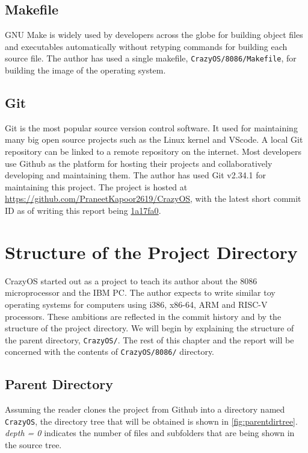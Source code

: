 \subsection{Makefile}
GNU Make is widely used by developers across the globe for building object files and executables automatically without retyping commands for building each source file. The author has used a single makefile, \verb|CrazyOS/8086/Makefile|, for building the image of the operating system.

\subsection{Git}
Git is the most popular source version control software. It used for maintaining many big open source projects such as the Linux kernel and VScode. A local Git repository can be linked to a remote repository on the internet. Most developers use Github as the platform for hosting their projects and collaboratively developing and maintaining them. The author has used Git v2.34.1 for maintaining this project. The project is hosted at \url{https://github.com/PraneetKapoor2619/CrazyOS}, with the latest short commit ID as of writing this report being \href{https://github.com/PraneetKapoor2619/CrazyOS/tree/1a17fa09b6df15038edabdefe9fd9ab04cb80907}{1a17fa0}.   

\section{Structure of the Project Directory}
CrazyOS started out as a project to teach its author about the 8086 microprocessor and the IBM PC. The author expects to write similar toy operating systems for computers using i386, x86-64, ARM and RISC-V processors. These ambitions are reflected in the commit history and by the structure of the project directory. We will begin by explaining the structure of the parent directory, \verb|CrazyOS/|. The rest of this chapter and the report will be concerned with the contents of \verb|CrazyOS/8086/| directory.

\subsection{Parent Directory}
Assuming the reader clones the project from Github into a directory named \verb|CrazyOS|, the directory tree that will be obtained is shown in \autoref{fig:parentdirtree}. \textit{depth = 0} indicates the number of files and subfolders that are being shown in the source tree.\\


